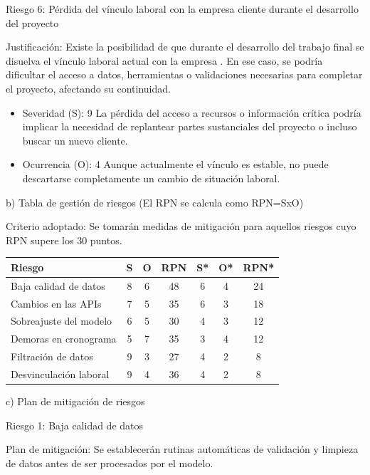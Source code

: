 \documentclass[
11pt, %
]{charter}
\begin{document}
Riesgo 6: Pérdida del vínculo laboral con la empresa cliente durante el desarrollo del proyecto

Justificación:
Existe la posibilidad de que durante el desarrollo del trabajo final se disuelva el vínculo laboral actual con la empresa \empclientename. En ese caso, se podría dificultar el acceso a datos, herramientas o validaciones necesarias para completar el proyecto, afectando su continuidad.

\begin{itemize}
	\item Severidad (S): 9
	La pérdida del acceso a recursos o información crítica podría implicar la necesidad de replantear partes sustanciales del proyecto o incluso buscar un nuevo cliente.
	\item Ocurrencia (O): 4
	Aunque actualmente el vínculo es estable, no puede descartarse completamente un cambio de situación laboral.
\end{itemize}

b) Tabla de gestión de riesgos      (El RPN se calcula como RPN=SxO)


Criterio adoptado:
Se tomarán medidas de mitigación para aquellos riesgos cuyo RPN supere los 30 puntos.


\begin{table}[htpb]
\centering
\begin{tabularx}{\linewidth}{@{}|X|c|c|c|c|c|c|@{}}
\hline
\rowcolor[HTML]{C0C0C0} 
Riesgo & S & O & RPN & S* & O* & RPN* \\ \hline
Baja calidad de datos       & 8  & 6  & 48    & 6   & 4   & 24     \\ \hline
Cambios en las APIs       & 7  & 5  & 35    & 6   & 3   & 18     \\ \hline
Sobreajuste del modelo       & 6  & 5  & 30    & 4   & 3   & 12     \\ \hline
Demoras en cronograma       & 5  & 7  & 35    & 3   & 4   & 12     \\ \hline
Filtración de datos       & 9  & 3  & 27    & 4   & 2   & 8     \\ \hline
Desvinculación laboral     & 9  & 4  & 36    & 4   & 2   & 8     \\ \hline
\end{tabularx}%
\end{table}

c) Plan de mitigación de riesgos

Riesgo 1: Baja calidad de datos

Plan de mitigación:
Se establecerán rutinas automáticas de validación y limpieza de datos antes de ser procesados por el modelo.
\end{document}
